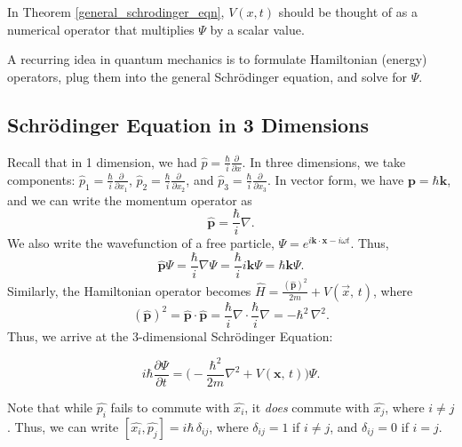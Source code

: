In Theorem \ref{general_schrodinger_eqn}, $V(x,t)$ should be thought of as a numerical operator that multiplies $\Psi$ by a scalar value. 

\begin{framedtip*}
    A recurring idea in quantum mechanics is to formulate Hamiltonian (energy) operators, plug them into the general Schrödinger equation, and solve for $\Psi$.
\end{framedtip*}

\subsection{Schrödinger Equation in 3 Dimensions}

Recall that in 1 dimension, we had $\hat{p}=\frac{\hbar}{i}\frac{\partial}{\partial x}$. In three dimensions, we take components: $\hat{p}_1=\frac{\hbar}{i}\frac{\partial}{\partial x_1}$, $\hat{p}_2=\frac{\hbar}{i}\frac{\partial}{\partial x_2}$, and $\hat{p}_3=\frac{\hbar}{i}\frac{\partial}{\partial x_3}$. In vector form, we have $\mathbf{p}=\hbar \mathbf{k}$, and we can write the momentum operator as $$\hat{\mathbf{p}}=\frac{\hbar}{i}\nabla.$$ We also write the wavefunction of a free particle, $\Psi=e^{i\mathbf{k}\cdot\mathbf{x}-i\omega t}$. Thus, $$\hat{\mathbf{p}}\Psi=\frac{\hbar}{i}\nabla\Psi=\frac{\hbar}{i}i\mathbf{k}\Psi=\hbar\mathbf{k}\Psi.$$Similarly, the Hamiltonian operator becomes $\hat{H}=\frac{(\hat{\mathbf{p}})^2}{2m}+V(\vec{x},\,t)$, where $$(\hat{\mathbf{p}})^2=\hat{\mathbf{p}}\cdot\hat{\mathbf{p}}=\frac{\hbar}{i}\nabla\cdot\frac{\hbar}{i}\nabla=-\hbar^2\,\nabla^2.$$Thus, we arrive at the 3-dimensional Schrödinger Equation:

\begin{framedthm}
   $$i\hbar\frac{\partial\Psi}{\partial t}=\bigg(-\frac{\hbar^2}{2m}\nabla^2+V(\mathbf{x},\,t)\bigg)\Psi.$$ 
\end{framedthm} 

Note that while $\hat{p_i}$ fails to commute with $\hat{x_i}$, it \textit{does} commute with $\hat{x_j}$, where $i\neq j$. Thus, we can write $[\hat{x_i},\hat{p_j}]=i\hbar\,\delta_{ij}$, where $\delta_{ij}=1$ if $i\neq j$, and $\delta_{ij}=0$ if $i=j$.